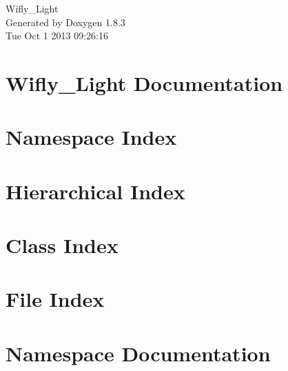 \documentclass{book}
\begin{document}
\hypersetup{pageanchor=false,citecolor=blue}
\begin{titlepage}
\vspace*{7cm}
\begin{center}
{\Large Wifly\-\_\-\-Light }\\
\vspace*{1cm}
{\large Generated by Doxygen 1.8.3}\\
\vspace*{0.5cm}
{\small Tue Oct 1 2013 09:26:16}\\
\end{center}
\end{titlepage}
\clearemptydoublepage
{}
\tableofcontents
\clearemptydoublepage
{}
\hypersetup{pageanchor=true,citecolor=blue}
\chapter{Wifly\-\_\-\-Light Documentation}
\label{index}\hypertarget{index}{}
\chapter{Namespace Index}

\chapter{Hierarchical Index}

\chapter{Class Index}

\chapter{File Index}

\chapter{Namespace Documentation}

\end{document}
